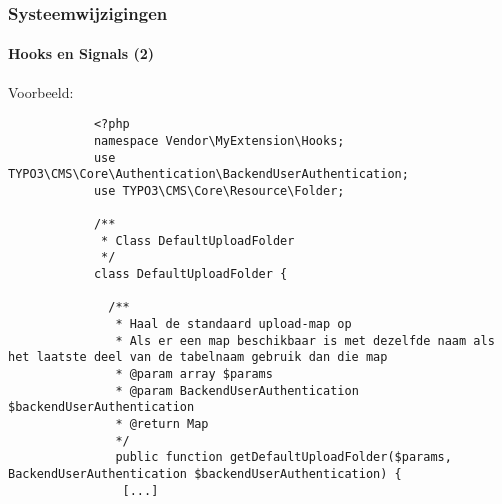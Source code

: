 \begin{frame}[fragile]
	\frametitle{Systeemwijzigingen}
	\framesubtitle{Hooks en Signals (2)}

	\lstset{basicstyle=\tiny\ttfamily}

	\small Voorbeeld:\normalsize

		\begin{lstlisting}
			<?php
			namespace Vendor\MyExtension\Hooks;
			use TYPO3\CMS\Core\Authentication\BackendUserAuthentication;
			use TYPO3\CMS\Core\Resource\Folder;

			/**
			 * Class DefaultUploadFolder
			 */
			class DefaultUploadFolder {

			  /**
			   * Haal de standaard upload-map op
			   * Als er een map beschikbaar is met dezelfde naam als het laatste deel van de tabelnaam gebruik dan die map
			   * @param array $params
			   * @param BackendUserAuthentication $backendUserAuthentication
			   * @return Map
			   */
			   public function getDefaultUploadFolder($params, BackendUserAuthentication $backendUserAuthentication) {
			    [...]
		\end{lstlisting}

\end{frame}

